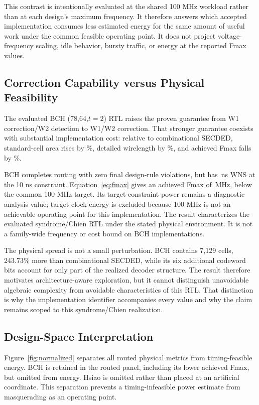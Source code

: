 This contrast is intentionally evaluated at the shared 100 MHz workload rather than at each design's maximum frequency. It therefore answers which accepted implementation consumes less estimated energy for the same amount of useful work under the common feasible operating point. It does not project voltage-frequency scaling, idle behavior, bursty traffic, or energy at the reported Fmax values.



\subsection{Correction Capability versus Physical Feasibility}

The evaluated BCH (78,64,$t=2$) RTL raises the proven guarantee from W1 correction/W2 detection to W1/W2 correction. That stronger guarantee coexists with substantial implementation cost: relative to combinational SECDED, standard-cell area rises by \BchAreaPct\%, detailed wirelength by \BchWirePct\%, and achieved Fmax falls by \BchFmaxReductionPct\%.

BCH completes routing with zero final design-rule violations, but has \BchWns\,ns WNS at the 10 ns constraint. Equation~\eqref{eq:fmax} gives an achieved Fmax of \BchFmax\,MHz, below the common 100 MHz target. Its target-constraint power remains a diagnostic analysis value; target-clock energy is excluded because 100 MHz is not an achievable operating point for this implementation. The result characterizes the evaluated syndrome/Chien RTL under the stated physical environment. It is not a family-wide frequency or cost bound on BCH implementations.

The physical spread is not a small perturbation. BCH contains 7,129 cells, 243.73\% more than combinational SECDED, while its six additional codeword bits account for only part of the realized decoder structure. The result therefore motivates architecture-aware exploration, but it cannot distinguish unavoidable algebraic complexity from avoidable characteristics of this RTL. That distinction is why the implementation identifier accompanies every value and why the claim remains scoped to this syndrome/Chien realization.

\subsection{Design-Space Interpretation}

Figure~\ref{fig:normalized} separates all routed physical metrics from timing-feasible energy. BCH is retained in the routed panel, including its lower achieved Fmax, but omitted from energy. Hsiao is omitted rather than placed at an artificial coordinate. This separation prevents a timing-infeasible power estimate from masquerading as an operating point.

